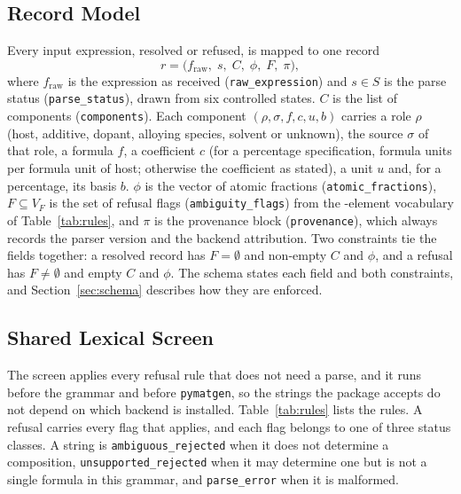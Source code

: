 \documentclass[10pt,journal]{IEEEtran}
\newcommand{\pmg}{\texttt{pymatgen}\xspace}
\begin{document}
\subsection{Record Model}
\label{sec:record}
Every input expression, resolved or refused, is mapped to one record
\begin{equation}
\label{eq:record}
r = \bigl(f_{\mathrm{raw}},\; s,\; C,\; \phi,\; F,\; \pi\bigr),
\end{equation}
where $f_{\mathrm{raw}}$ is the expression as received (\texttt{raw\_expression}) and $s\in S$ is the parse status (\texttt{parse\_status}), drawn from six controlled states. $C$ is the list of components (\texttt{components}). Each component $(\rho, \sigma, f, c, u, b)$ carries a role $\rho$ (host, additive, dopant, alloying species, solvent or unknown), the source $\sigma$ of that role, a formula $f$, a coefficient $c$ (for a percentage specification, formula units per formula unit of host; otherwise the coefficient as stated), a unit $u$ and, for a percentage, its basis $b$. $\phi$ is the vector of atomic fractions (\texttt{atomic\_fractions}), $F\subseteq V_F$ is the set of refusal flags (\texttt{ambiguity\_flags}) from the \NFlags{}-element vocabulary of Table~\ref{tab:rules}, and $\pi$ is the provenance block (\texttt{provenance}), which always records the parser version and the backend attribution. Two constraints tie the fields together: a resolved record has $F=\emptyset$ and non-empty $C$ and $\phi$, and a refusal has $F\neq\emptyset$ and empty $C$ and $\phi$. The schema states each field and both constraints, and Section~\ref{sec:schema} describes how they are enforced.

\subsection{Shared Lexical Screen}
\label{sec:screen}
The screen applies every refusal rule that does not need a parse, and it runs before the grammar and before \pmg, so the strings the package accepts do not depend on which backend is installed. Table~\ref{tab:rules} lists the rules. A refusal carries every flag that applies, and each flag belongs to one of three status classes. A string is \texttt{ambiguous\_rejected} when it does not determine a composition, \texttt{unsupported\_rejected} when it may determine one but is not a single formula in this grammar, and \texttt{parse\_error} when it is malformed.


\end{document}
